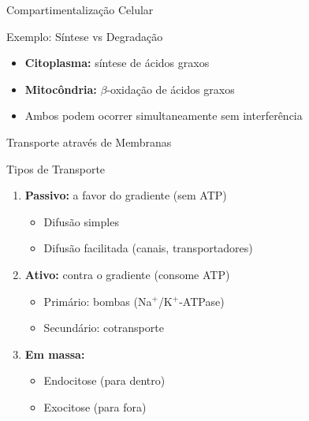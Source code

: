 \begin{frame}[allowframebreaks]{Compartimentalização Celular}

\vspace{0.3cm}

\begin{exampleblock}{Exemplo: Síntese vs Degradação}
\begin{itemize}
    \item \textbf{Citoplasma:} síntese de ácidos graxos
    \item \textbf{Mitocôndria:} $\beta$-oxidação de ácidos graxos
    \item Ambos podem ocorrer simultaneamente sem interferência
\end{itemize}
\end{exampleblock}
\end{frame}

\begin{frame}[allowframebreaks]{Transporte através de Membranas}
\begin{block}{Tipos de Transporte}
\begin{enumerate}
    \item \textbf{Passivo:} a favor do gradiente (sem ATP)
    \begin{itemize}
        \item Difusão simples
        \item Difusão facilitada (canais, transportadores)
    \end{itemize}

    \item \textbf{Ativo:} contra o gradiente (consome ATP)
    \begin{itemize}
        \item Primário: bombas (Na$^+$/K$^+$-ATPase)
        \item Secundário: cotransporte
    \end{itemize}

    \item \textbf{Em massa:}
    \begin{itemize}
        \item Endocitose (para dentro)
        \item Exocitose (para fora)
    \end{itemize}
\end{enumerate}
\end{block}
\end{frame}

